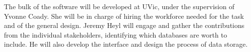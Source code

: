 The bulk of the software will be developed at UVic, under the supervision of Yvonne Coady. She will be in charge of hiring the workforce needed for the task and of the general design.
Jeremy Heyl will engage and gather the contributions from the individual stakeholders, identifying which databases are worth to include. He will also develop the interface and design the process of data storage.

